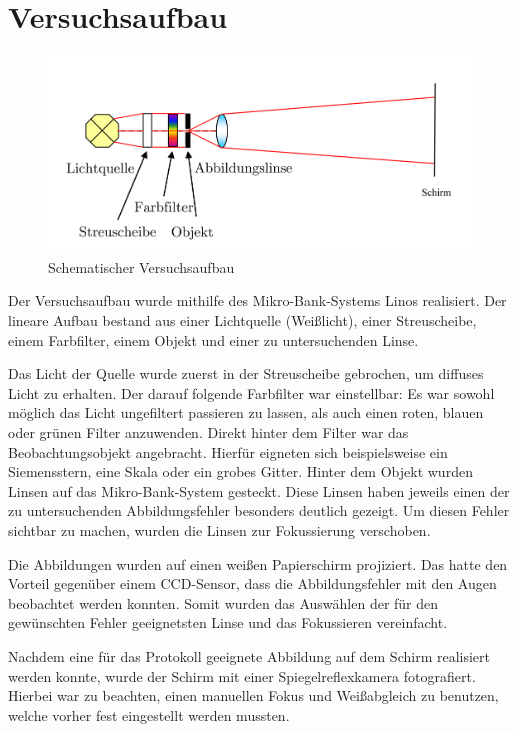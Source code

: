 \section{Versuchsaufbau}

\begin{figure}[h!]
	\includegraphics[width=\linewidth]{img/versuchsaufbau.png}
	\caption{Schematischer Versuchsaufbau}
	\label{fig:versuchsaufbau}
\end{figure}

Der Versuchsaufbau wurde mithilfe des Mikro-Bank-Systems Linos realisiert. Der lineare Aufbau bestand aus einer Lichtquelle (Weißlicht), einer Streuscheibe, einem Farbfilter, einem Objekt und einer zu untersuchenden Linse. 

Das Licht der Quelle wurde zuerst in der Streuscheibe gebrochen, um diffuses Licht zu erhalten. Der darauf folgende Farbfilter war einstellbar: Es war sowohl möglich das Licht ungefiltert passieren zu lassen, als auch einen roten, blauen oder grünen Filter anzuwenden. Direkt hinter dem Filter war das Beobachtungsobjekt angebracht. Hierfür eigneten sich beispielsweise ein Siemensstern, eine Skala oder ein grobes Gitter. Hinter dem Objekt wurden Linsen auf das Mikro-Bank-System gesteckt. Diese Linsen haben jeweils einen der zu untersuchenden Abbildungsfehler besonders deutlich gezeigt. Um diesen Fehler sichtbar zu machen, wurden die Linsen zur Fokussierung verschoben. 

Die Abbildungen wurden auf einen weißen Papierschirm projiziert. Das hatte den Vorteil gegenüber einem CCD-Sensor, dass die Abbildungsfehler mit den Augen beobachtet werden konnten. Somit wurden das Auswählen der für den gewünschten Fehler geeignetsten Linse und das Fokussieren vereinfacht.

Nachdem eine für das Protokoll geeignete Abbildung auf dem Schirm realisiert werden konnte, wurde der Schirm mit einer Spiegelreflexkamera fotografiert. Hierbei war zu beachten, einen manuellen Fokus und Weißabgleich zu benutzen, welche vorher fest eingestellt werden mussten. 


